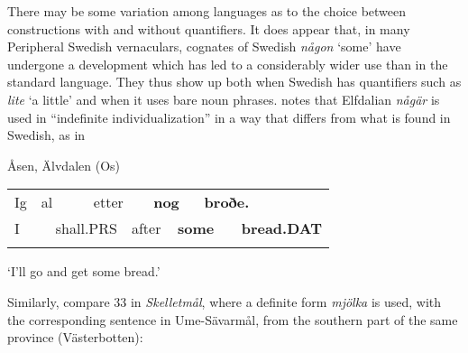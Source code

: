 \begin{styleBodyTextFirst}
There may be some variation among languages as to the choice between constructions with and without quantifiers. It does appear that, in many Peripheral Swedish vernaculars, cognates of Swedish \textit{någon} ‘some’ have undergone a development which has led to a considerably wider use than in the standard language. They thus show up both when Swedish has quantifiers such as \textit{lite} ‘a little’ and when it uses bare noun phrases. \citet[110]{Levander1909} notes that Elfdalian \textit{någär }is used in “indefinite individualization” in a way that differs from what is found in Swedish, as in 

\end{styleBodyTextFirst}

\begin{listWWNumileveli}
\item {}

\begin{styleExample}
Åsen, Älvdalen (Os)

\end{styleExample}

\end{listWWNumileveli}

\begin{tabular}{llllllllll}
\lsptoprule
Ig & \multicolumn{2}{l}{al

} & \multicolumn{2}{l}{etter

} & \multicolumn{2}{l}{{\bfseries nog}

} & \multicolumn{2}{l}{{\bfseries broðe.}

} & \\
\multicolumn{2}{l}{I

} & \multicolumn{2}{l}{shall.PRS

} & \multicolumn{2}{l}{after

} & \multicolumn{2}{l}{{\bfseries some}

} & \multicolumn{2}{l}{{\bfseries bread.DAT}

}\\
\lspbottomrule
\end{tabular}

\begin{styleTranslation}
‘I’ll go and get some bread.’ 

\end{styleTranslation}

\begin{styleBodyTextFirst}
Similarly, compare 33 in \textit{Skelletmål}, where a definite form \textit{mjölka} is used, with the corresponding sentence in Ume-Sävarmål, from the southern part of the same province (Västerbotten):

\end{styleBodyTextFirst}

